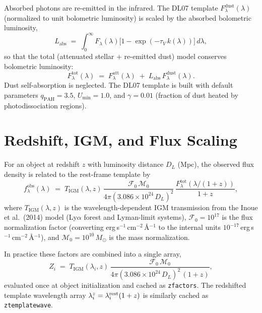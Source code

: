 \documentclass[12pt]{article}
\newcommand{\tauv}{\tau_{V}}
\newcommand{\klam}{k(\lambda)}
\newcommand{\Tigm}{T_{\mathrm{IGM}}}
\newcommand{\DL}{D_L}
\newcommand{\Msun}{M_{\odot}}
\newcommand{\flam}{f_\lambda}
\newcommand{\Flam}{F_\lambda}
\begin{document}
Absorbed photons are re-emitted in the infrared.  The DL07 template
$\Flam^{\mathrm{dust}}(\lambda)$ (normalized to unit bolometric luminosity)
is scaled by the absorbed bolometric luminosity,
\begin{equation}
  L_{\mathrm{abs}}
  \;=\; \int_0^\infty \Flam(\lambda)
        \bigl[1 - \exp(-\tauv\,\klam)\bigr]\,d\lambda,
  \label{eq:labs}
\end{equation}
so that the total (attenuated stellar $+$ re-emitted dust) model conserves
bolometric luminosity:
\begin{equation}
  \boxed{
  \Flam^{\mathrm{tot}}(\lambda)
  \;=\; \Flam^{\mathrm{att}}(\lambda)
        \;+\; L_{\mathrm{abs}}\,\Flam^{\mathrm{dust}}(\lambda).
  }
  \label{eq:etot}
\end{equation}
Dust self-absorption is neglected.  The DL07 template is built with
default parameters $q_\mathrm{PAH} = 3.5$, $U_\mathrm{min} = 1.0$, and
$\gamma = 0.01$ (fraction of dust heated by photodissociation regions).


\section{Redshift, IGM, and Flux Scaling}
\label{sec:zfactors}

For an object at redshift $z$ with luminosity distance $\DL$ (Mpc), the
observed flux density is related to the rest-frame template by
\begin{equation}
  \flam^{\mathrm{obs}}(\lambda)
  \;=\;
  \Tigm(\lambda,z)\,
  \frac{\mathcal{F}_0\,\mathcal{M}_0}{4\pi (3.086\times10^{24}\,\DL)^2}
  \,\frac{\Flam^{\mathrm{tot}}(\lambda/(1+z))}{1+z},
  \label{eq:zfactor}
\end{equation}
where $\Tigm(\lambda,z)$ is the wavelength-dependent IGM transmission from
the Inoue et al.\ (2014) model (Ly$\alpha$ forest and Lyman-limit systems),
$\mathcal{F}_0 = 10^{17}$ is the flux normalization factor
(converting erg\,s$^{-1}$\,cm$^{-2}$\,\AA$^{-1}$ to the internal units
$10^{-17}$\,erg\,s$^{-1}$\,cm$^{-2}$\,\AA$^{-1}$), and
$\mathcal{M}_0 = 10^{10}\,\Msun$ is the mass normalization.

In practice these factors are combined into a single array,
\begin{equation}
  Z_i \;=\; \Tigm(\lambda_i,z)\,
            \frac{\mathcal{F}_0\,\mathcal{M}_0}
                 {4\pi(3.086\times10^{24}\,\DL)^2\,(1+z)},
  \label{eq:zfactors}
\end{equation}
evaluated once at object initialization and cached as \texttt{zfactors}.
The redshifted template wavelength array $\lambda_i^z = \lambda_i^{\rm rest}(1+z)$
is similarly cached as \texttt{ztemplatewave}.
\end{document}
